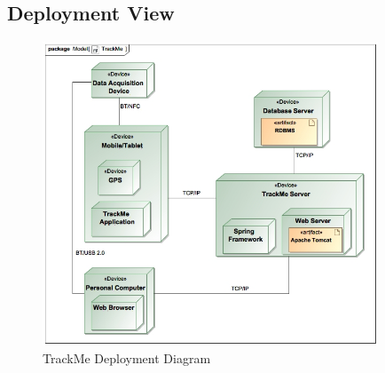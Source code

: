 \documentclass[a4paper]{article}
\begin{document}
\subsection{Deployment View}
\begin{figure}[!htpb]
    \centering
    \includegraphics[width=100mm,keepaspectratio]{images/UML/deployment_TrackMe.jpg}
    \caption{TrackMe Deployment Diagram}
    \label{fig:deployment_trackme}
\end{figure}

\newpage
\end{document}
